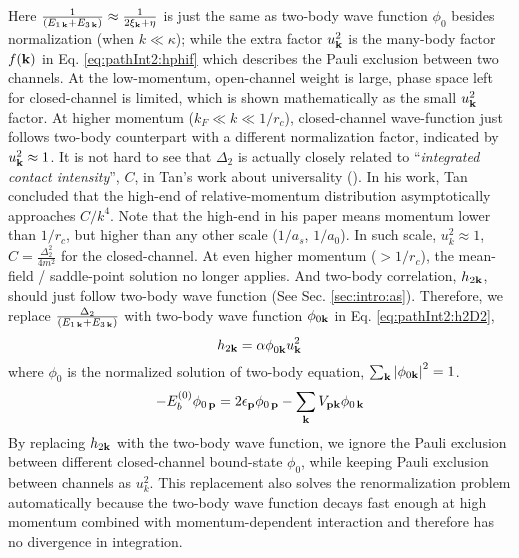 Here $\frac{1}{(E_{1\,\mathbf{k}}+E_{3\,\mathbf{k}})}\approx\frac{1}{2\xi_{\mathbf{k}}+\eta}$ is just the same as two-body wave function $\phi_{0}$  besides normalization (when $k\ll\kappa$); while the extra factor $u_{\mathbf{k}}^{2}$ is the many-body factor $f(\mathbf{k})$ in Eq. \ref{eq:pathInt2:hphif} which describes the Pauli exclusion between two channels.  At the low-momentum, open-channel weight is large, phase space left for closed-channel is limited, which is shown mathematically as the small $u_{\mathbf{k}}^{2}$ factor.   At higher momentum ($k_{F}\ll{k}\ll1/r_{c}$),  closed-channel wave-function just follows two-body counterpart with a different normalization factor, indicated by $u_{\mathbf{k}}^{2}\approx1$.   It is not hard to see that $\Delta_{2}$ is actually closely related to ``\emph{integrated contact intensity}'', $C$, in Tan's work about universality (\cite{Tan2008-1,Tan2008-2}).  In his work, Tan concluded that  the high-end of relative-momentum distribution asymptotically approaches  $C/k^{4}$.  Note that the high-end in his paper means momentum lower than $1/r_{c}$, but higher than any other scale ($1/a_{s}$, $1/a_{0}$).  In such scale, $u_{k}^2\approx1$, %
$C=\frac{\Delta_{2}^{2}}{4m^{2}}$ for the closed-channel.   
At even higher momentum ($>1/r_{c}$), the mean-field / saddle-point solution no longer applies.  And  two-body correlation, $h_{2\mathbf{k}}$, should just follow two-body wave function (See Sec. \ref{sec:intro:as}).  Therefore, we replace $\frac{\Delta_{2}}{(E_{1\,\mathbf{k}}+E_{3\,\mathbf{k}})}$ with two-body wave function $\phi_{0\mathbf{k}}$ in Eq. \ref{eq:pathInt2:h2D2},
\begin{equation}\label{eq:pathInt2:hphi}
h_{2\mathbf{k}}=\alpha\phi^{}_{0\mathbf{k}}u_{\mathbf{k}}^{2}
\end{equation}
where $\phi_{0}$ is the normalized  solution of  two-body \sch equation, $\sum_{\mathbf{k}}\left\lvert{\phi_{0\ensuremath{\mathbf{k}}}}\right\rvert^{2}=1$.
\begin{equation}\label{eq:pathInt2:phi}
-E_{b}^{(0)}\phi_{0\,\mathbf{p}}=2\epsilon_{\mathbf{p}}\phi_{0\,\mathbf{p}}-\sum_{\mathbf{k}}V_{\mathbf{p}\mathbf{k}} \phi_{0\,\mathbf{k}}
\end{equation}
By replacing $h_{2\mathbf{k}}$ with the two-body wave function, we ignore the Pauli exclusion between different closed-channel bound-state $\phi_{0}$, while keeping Pauli exclusion between channels as $u_{k}^{2}$.
This replacement also solves the renormalization problem automatically because the two-body wave function decays fast enough at high momentum combined with momentum-dependent interaction and therefore has no divergence in integration.  

